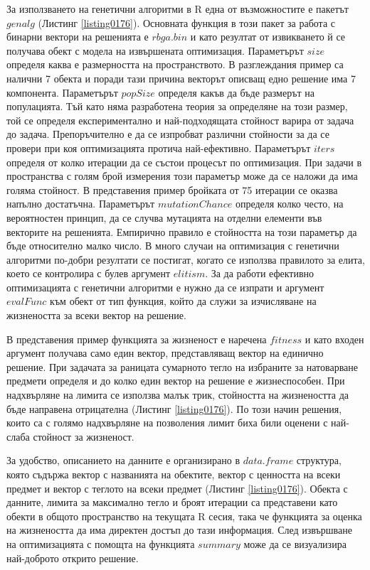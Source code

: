 За използването на генетични алгоритми в R една от възможностите е пакетът $genalg$ (Листинг \ref{listing0176}). Основната функция в този пакет за работа с бинарни вектори на решенията е $rbga.bin$ и като резултат от извикването й се получава обект с модела на извършената оптимизация. Параметърът $size$ определя каква е размерността на пространството. В разглеждания пример са налични 7 обекта и поради тази причина векторът описващ едно решение има 7 компонента. Параметърът $popSize$ определя какъв да бъде размерът на популацията. Тъй като няма разработена теория за определяне на този размер, той се определя експериментално и най-подходящата стойност варира от задача до задача. Препоръчително е да се изпробват различни стойности за да се провери при коя оптимизацията протича най-ефективно. Параметърът $iters$ определя от колко итерации да се състои процесът по оптимизация. При задачи в пространства с голям брой измерения този параметър може да се наложи да има голяма стойност. В представения пример бройката от 75 итерации се оказва напълно достатъчна. Параметърът $mutationChance$ определя колко често, на вероятностен принцип, да се случва мутацията на отделни елементи във векторите на решенията. Емпирично правило е стойността на този параметър да бъде относително малко число. В много случаи на оптимизация с генетични алгоритми по-добри резултати се постигат, когато се използва правилото за елита, което се контролира с булев аргумент $elitism$. За да работи ефективно оптимизацията с генетични алгоритми е нужно да се изпрати и аргумент $evalFunc$ към обект от тип функция, който да служи за изчисляване на жизнеността за всеки вектор на решение. 

В представения пример функцията за жизненост е наречена $fitness$ и като входен аргумент получава само един вектор, представляващ вектор на единично решение. При задачата за раницата сумарното тегло на избраните за натоварване предмети определя и до колко един вектор на решение е жизнеспособен. При надхвърляне на лимита се използва малък трик, стойността на жизнеността да бъде направена отрицателна (Листинг \ref{listing0176}). По този начин решения, които са с голямо надхвърляне на позволения лимит биха били оценени с най-слаба стойност за жизненост. 

За удобство, описанието на данните е организирано в $data.frame$ структура, която съдържа вектор с названията на обектите, вектор с ценността на всеки предмет и вектор с теглото на всеки предмет (Листинг \ref{listing0176}). Обекта с данните, лимита за максимално тегло и броят итерации са представени като обекти в общото пространство на текущата R сесия, така че функцията за оценка на жизнеността да има директен достъп до тази информация. След извършване на оптимизацията с помощта на функцията $summary$ може да се визуализира най-доброто открито решение. 


